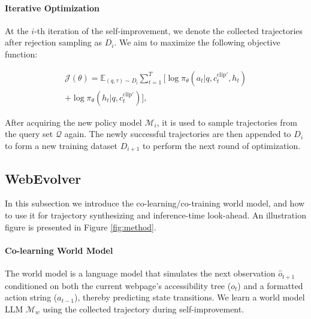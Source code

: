 \documentclass[11pt]{article}
\begin{document}
\paragraph{Iterative Optimization}

At the $i$-th iteration of the self-improvement, we denote the collected trajectories after rejection sampling as $D_{i}$.
We aim to maximize the following objective function:

\begin{align}\label{equation:J-bc}
    \mathcal{J}(\theta) = \mathbb{E}_{(q,\tau) \sim D_{\text{i}}} \sum_{t=1}^T \Big[\log \pi_\theta(a_t | q, c_t^{\text{clip}'}, h_t) \nonumber  \\
    + \log \pi_\theta(h_t | q, c_t^{\text{clip}'})\Big],
\end{align}

After acquiring the new policy model $\mathcal{M}_i$, it is used to sample trajectories from the query set $\mathcal{Q}$ again. The newly successful trajectories are then appended to $D_{i}$ to form a new training dataset $D_{i+1}$ to perform the next round of optimization.



\subsection{WebEvolver}

In this subsection we introduce the co-learning/co-training world model, and how to use it for trajectory synthesizing and inference-time look-ahead. An illustration figure is presented in Figure \ref{fig:method}.

\paragraph{Co-learning World Model}
The world model is a language model that simulates the next observation $\hat{o}_{t+1}$ conditioned on both the current webpage's accessibility tree ($o_t$) and a formatted action string ($a_{t-1}$), thereby predicting state transitions.
We learn a world model LLM $\mathcal{M}_w$ using the collected trajectory during self-improvement. 
\end{document}
